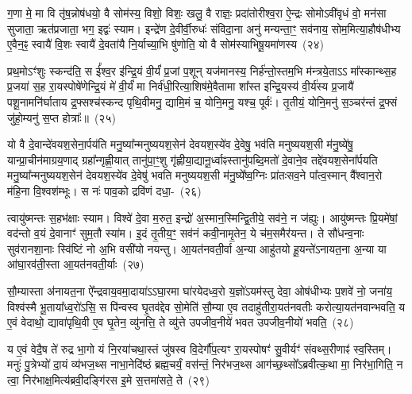 ग॒णा मे॒ मा वि तृ॑ष॒न्नोष॑धयो॒ वै सोम॑स्य॒ विशो॒ विशः॒ खलु॒ वै राज्ञः॒ प्रदा॑तोरीश्व॒रा ऐ॒न्द्रः सोमो\-ऽवी॑वृधं वो॒ मन॑सा सुजाता॒ ऋत॑प्रजाता॒ भग॒ इद्वः॑ स्याम। इन्द्रे॑ण दे॒वीर्वी॒रुधः॑ संविदा॒ना अनु॑ मन्यन्ता॒ꣳ॒ सव॑नाय॒ सोम॒मित्या॒हौष॑धीभ्य ए॒वैन॒ꣴ॒ स्वायै॑ वि॒शः स्वायै॑ दे॒वता॑यै नि॒र्याच्या॒भि षु॑णोति॒ यो वै सोम॑स्याभिषू॒यमा॑णस्य~(२४)

प्रथ॒मो\-ऽꣳ॑शुः स्कन्द॑ति॒ स ई᳚श्व॒र इ॑न्द्रि॒यं वी॒र्यं॑ प्र॒जां प॒शून् यज॑मानस्य॒ निर्\mbox{}ह॑न्तो॒स्तम॒भि म॑न्त्रये॒ताऽऽ मा᳚स्कान्थ्स॒ह प्र॒जया॑ स॒ह रा॒यस्पोषे॑णेन्द्रि॒यं मे॑ वी॒र्यं॑ मा निर्व॑धी॒रित्या॒शिष॑मे॒वैतामा शा᳚स्त इन्द्रि॒यस्य॑ वी॒र्य॑स्य प्र॒जायै॑ पशू॒नामनि॑र्घाताय द्र॒फ्सश्च॑स्कन्द पृथि॒वीमनु॒ द्यामि॒मं च॒ योनि॒मनु॒ यश्च॒ पूर्वः॑। तृ॒तीयं॒ योनि॒मनु॑ स॒ञ्चर॑न्तं द्र॒फ्सं जु॑हो॒म्यनु॑ स॒प्त होत्राः᳚॥~(२५)

{\anuvakamend[{त॒र्पय॑त मा\-ऽभिषू॒यमा॑णस्य॒ यश्च॒ दश॑ च}]}%

यो वै दे॒वान्दे॑वयश॒सेना॒र्पय॑ति मनु॒ष्या᳚न्मनुष्ययश॒सेन॑ देव\-यश॒स्ये॑व दे॒वेषु॒ भव॑ति मनुष्ययश॒सी म॑नु॒ष्ये॑षु॒ यान्प्रा॒चीन॑\-माग्रय॒णाद् ग्रहा᳚न्गृह्णी॒यात् तानु॑पा॒ꣳ॒शु गृ॑ह्णीया॒द्यानू॒र्ध्वाꣴस्तानु॑पब्दि॒मतो॑ दे॒वाने॒व तद्दे॑वयश॒सेना᳚र्पयति मनु॒ष्या᳚न्मनुष्ययश॒सेन॑ देवयश॒स्ये॑व दे॒वेषु॑ भवति मनुष्ययश॒सी म॑नु॒ष्ये᳚ष्व॒ग्निः प्रा॑तःसव॒ने पा᳚त्व॒स्मान् वै᳚श्वान॒रो म॑हि॒ना वि॒श्वश॑म्भूः। स नः॑ पाव॒को द्रवि॑णं दधा॒-~(२६)

त्वायु॑ष्मन्तः स॒हभ॑क्षाः स्याम। विश्वे॑ दे॒वा म॒रुत॒ इन्द्रो॑ अ॒स्मान॒स्मिन्द्वि॒तीये॒ सव॑ने॒ न ज॑ह्युः। आयु॑ष्मन्तः प्रि॒यमे॑षां॒ वद॑न्तो व॒यं दे॒वानाꣳ॑ सुम॒तौ स्या॑म। इ॒दं तृ॒तीय॒ꣳ॒ सव॑नं कवी॒नामृ॒तेन॒ ये च॑म॒समैर॑यन्त। ते सौ॑धन्व॒नाः सुव॑रानशा॒नाः स्वि॑ष्टिं नो अ॒भि वसी॑यो नयन्तु। आ॒यत॑नवती॒र्वा अ॒न्या आहु॑तयो हू॒यन्ते॑\-ऽनायत॒ना अ॒न्या या आ॑घा॒रव॑ती॒स्ता आ॒यत॑नवती॒र्याः~(२७)

सौ॒म्यास्ता अ॑नायत॒ना ऐ᳚न्द्रवाय॒वमा॒दाया॑ऽऽघा॒रमा घा॑रयेदध्व॒रो य॒ज्ञो॑\-ऽयम॑स्तु देवा॒ ओष॑धीभ्यः प॒शवे॑ नो॒ जना॑य॒ विश्व॑स्मै भू॒ताया᳚ध्व॒रो॑\-ऽसि॒ स पि॑न्वस्व घृ॒तव॑द्देव सो॒मेति॑ सौ॒म्या ए॒व तदाहु॑तीरा॒यत॑नवतीः करोत्या॒यत॑नवान्भवति॒ य ए॒वं वेदाथो॒ द्यावा॑पृथि॒वी ए॒व घृ॒तेन॒ व्यु॑नत्ति॒ ते व्यु॑त्ते उपजीव॒नीये॑ भवत उपजीव॒नीयो॑ भवति॒~(२८)

य ए॒वं वेदै॒ष ते॑ रुद्र भा॒गो यं नि॒रया॑चथा॒स्तं जु॑षस्व वि॒देर्गौ॑प॒त्यꣳ रा॒यस्पोषꣳ॑ सु॒वीर्यꣳ॑ संवथ्स॒रीणाꣴ॑ स्व॒स्तिम्। मनुः॑ पु॒त्रेभ्यो॑ दा॒यं व्य॑भज॒थ्स नाभा॒नेदि॑ष्ठं ब्रह्म॒चर्यं॒ वस॑न्तं॒ निर॑भज॒थ्स आग॑च्छ॒थ्सो᳚\-ऽब्रवीत्क॒था मा॒ निर॑भा॒गिति॒ न त्वा॒ निर॑भाक्ष॒मित्य॑ब्रवी॒दङ्गि॑रस इ॒मे स॒त्तमा॑सते॒ ते~(२९)

